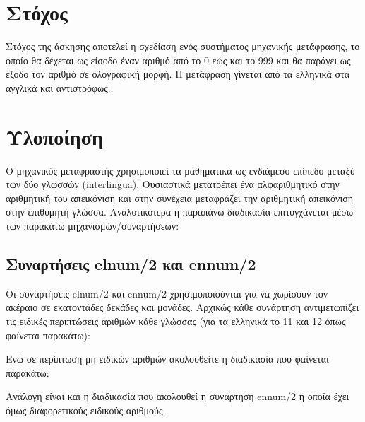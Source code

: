 \documentclass[a4paper,12pt]{article}
\begin{document}
\section{Στόχος}
Στόχος της άσκησης αποτελεί η σχεδίαση ενός συστήματος μηχανικής μετάφρασης, το οποίο θα δέχεται ως είσοδο έναν αριθμό από το 0 εώς και το 999 και θα παράγει ως έξοδο τον αριθμό σε ολογραφική μορφή. Η μετάφραση γίνεται από τα ελληνικά στα αγγλικά και αντιστρόφως. 
\section{Υλοποίηση}
Ο μηχανικός μεταφραστής χρησιμοποιεί τα μαθηματικά ως ενδιάμεσο επίπεδο μεταξύ των δύο γλωσσών (interlingua). Ουσιαστικά μετατρέπει ένα αλφαριθμητικό στην αριθμητική του απεικόνιση και στην συνέχεια μεταφράζει την αριθμητική απεικόνιση στην επιθυμητή γλώσσα. Αναλυτικότερα η παραπάνω διαδικασία επιτυγχάνεται μέσω των παρακάτω μηχανισμών/συναρτήσεων:
	\subsection{Συναρτήσεις elnum/2 και ennum/2}
	Οι συναρτήσεις elnum/2 και ennum/2 χρησιμοποιούνται για να χωρίσουν τον ακέραιο σε εκατοντάδες δεκάδες και μονάδες. Αρχικώς κάθε συνάρτηση αντιμετωπίζει τις ειδικές περιπτώσεις αριθμών κάθε γλώσσας (για τα ελληνικά το 11 και 12 όπως φαίνεται παρακάτω):

Ενώ σε περίπτωση μη ειδικών αριθμών ακολουθείτε η διαδικασία που φαίνεται παρακάτω:

Ανάλογη είναι και η διαδικασία που ακολουθεί η συνάρτηση ennum/2 η οποία έχει όμως διαφορετικούς ειδικούς αριθμούς.

		
\end{document}
